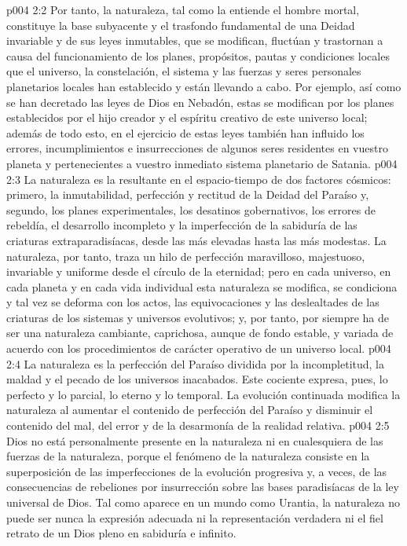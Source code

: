 \vs p004 2:2 Por tanto, la naturaleza, tal como la entiende el hombre mortal, constituye la base subyacente y el trasfondo fundamental de una Deidad invariable y de sus leyes inmutables, que se modifican, fluctúan y trastornan a causa del funcionamiento de los planes, propósitos, pautas y condiciones locales que el universo, la constelación, el sistema y las fuerzas y seres personales planetarios locales han establecido y están llevando a cabo. Por ejemplo, así como se han decretado las leyes de Dios en Nebadón, estas se modifican por los planes establecidos por el hijo creador y el espíritu creativo de este universo local; además de todo esto, en el ejercicio de estas leyes también han influido los errores, incumplimientos e insurrecciones de algunos seres residentes en vuestro planeta y pertenecientes a vuestro inmediato sistema planetario de Satania.
\vs p004 2:3 \pc La naturaleza es la resultante en el espacio\hyp{}tiempo de dos factores cósmicos: primero, la inmutabilidad, perfección y rectitud de la Deidad del Paraíso y, segundo, los planes experimentales, los desatinos gobernativos, los errores de rebeldía, el desarrollo incompleto y la imperfección de la sabiduría de las criaturas extraparadisíacas, desde las más elevadas hasta las más modestas. La naturaleza, por tanto, traza un hilo de perfección maravilloso, majestuoso, invariable y uniforme desde el círculo de la eternidad; pero en cada universo, en cada planeta y en cada vida individual esta naturaleza se modifica, se condiciona y tal vez se deforma con los actos, las equivocaciones y las deslealtades de las criaturas de los sistemas y universos evolutivos; y, por tanto, por siempre ha de ser una naturaleza cambiante, caprichosa, aunque de fondo estable, y variada de acuerdo con los procedimientos de carácter operativo de un universo local.
\vs p004 2:4 La naturaleza es la perfección del Paraíso dividida por la incompletitud, la maldad y el pecado de los universos inacabados. Este cociente expresa, pues, lo perfecto y lo parcial, lo eterno y lo temporal. La evolución continuada modifica la naturaleza al aumentar el contenido de perfección del Paraíso y disminuir el contenido del mal, del error y de la desarmonía de la realidad relativa.
\vs p004 2:5 \pc Dios no está personalmente presente en la naturaleza ni en cualesquiera de las fuerzas de la naturaleza, porque el fenómeno de la naturaleza consiste en la superposición de las imperfecciones de la evolución progresiva y, a veces, de las consecuencias de rebeliones por insurrección sobre las bases paradisíacas de la ley universal de Dios. Tal como aparece en un mundo como Urantia, la naturaleza no puede ser nunca la expresión adecuada ni la representación verdadera ni el fiel retrato de un Dios pleno en sabiduría e infinito.
